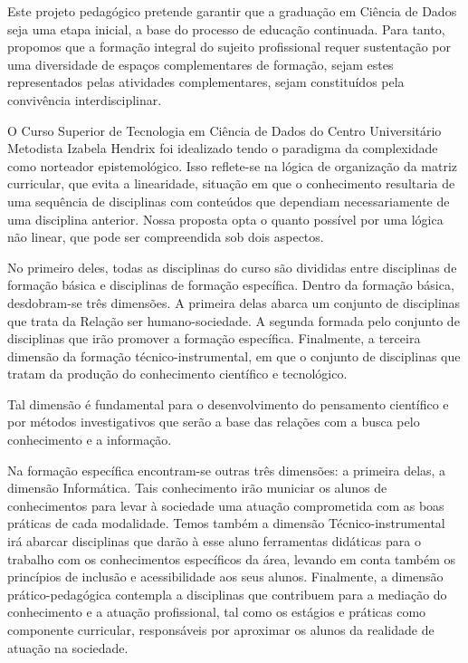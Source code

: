 \documentclass[a4paper, 12pt, openright, oneside, german, french, english, brazil]{abntex2}
\begin{document}
Este projeto pedagógico pretende garantir que a graduação em Ciência de Dados seja uma etapa inicial, a base do processo de educação continuada. Para tanto, propomos que a formação integral do sujeito profissional requer sustentação por uma diversidade de espaços complementares de formação, sejam estes representados pelas atividades complementares, sejam constituídos pela convivência interdisciplinar.

O Curso Superior de Tecnologia em Ciência de Dados do Centro Universitário Metodista Izabela Hendrix foi idealizado tendo o paradigma da complexidade como norteador epistemológico. Isso reflete-se na lógica de organização da matriz curricular, que evita a linearidade, situação em que o conhecimento resultaria de uma sequência de disciplinas com conteúdos que dependiam necessariamente de uma disciplina anterior. Nossa proposta opta o quanto possível por uma lógica não linear, que pode ser compreendida sob dois aspectos.

No primeiro deles, todas as disciplinas do curso são divididas entre disciplinas de formação básica e disciplinas de formação específica. Dentro da formação básica, desdobram-se três dimensões. A primeira delas abarca um conjunto de disciplinas que trata da Relação ser humano-sociedade. A segunda formada pelo conjunto de disciplinas que irão promover a formação específica. Finalmente, a terceira dimensão da formação técnico-instrumental, em que o conjunto de disciplinas que tratam da produção do conhecimento científico e tecnológico.

Tal dimensão é fundamental para o desenvolvimento do pensamento científico e por métodos investigativos que serão a base das relações com a busca pelo conhecimento e a informação.

Na formação específica encontram-se outras três dimensões: a primeira delas, a dimensão Informática. Tais conhecimento irão municiar os alunos de conhecimentos para levar à sociedade uma atuação comprometida com as boas práticas de cada modalidade. Temos também a dimensão Técnico-instrumental irá abarcar disciplinas que darão à esse aluno ferramentas didáticas para o trabalho com os conhecimentos específicos da área, levando em conta também os princípios de inclusão e acessibilidade aos seus alunos. Finalmente, a dimensão prático-pedagógica contempla a disciplinas que contribuem para a mediação do conhecimento e a atuação profissional, tal como os estágios e práticas como componente curricular, responsáveis por aproximar os alunos da realidade de atuação na sociedade.
\end{document}
